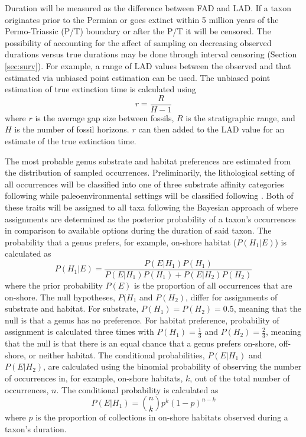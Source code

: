 \documentclass[12pt,letterpaper]{article}
\begin{document}
Duration will be measured as the difference between FAD and LAD. If a taxon originates prior to the Permian or goes extinct within 5 million years of the Permo-Triassic (P/T) boundary or after the P/T it will be censored. The possibility of accounting for the affect of sampling on decreasing observed durations versus true durations may be done through interval censoring (Section \ref{sec:surv}). For example, a range of LAD values between the observed and that estimated via unbiased point estimation \citep{Strauss1989,Alvarez1983a} can be used. The unbiased point estimation of true extinction time is calculated using
\begin{equation}
  r = \frac{R}{H - 1}
  \label{eq:stratest}
\end{equation}
where \(r\) is the average gap size between fossils, \(R\) is the stratigraphic range, and \(H\) is the number of fossil horizons. \(r\) can then added to the LAD value for an estimate of the true extinction time.

The most probable genus substrate and habitat preferences are estimated from the distribution of sampled occurrences. Preliminarily, the lithological setting of all occurrences will be classified into one of three substrate affinity categories following \citet{Foote2006} while paleoenvironmental settings will be classified following \citet{Kiessling2007}. Both of these traits will be assigned to all taxa following the Bayesian approach of \citet{Simpson2009} where assignments are determined as the posterior probability of a taxon's occurrences in comparison to available options during the duration of said taxon. The probability that a genus prefers, for example, on-shore habitat (\(P(H_{1}|E)\)) is calculated as
\begin{equation}
  P(H_{1}|E) = \frac{P(E|H_{1})P(H_{1})}{P(E|H_{1})P(H_{1}) + P(E|H_{2})P(H_{2})}
  \label{eq:aff}
\end{equation}
where the prior probability \(P(E)\) is the proportion of all occurrences that are on-shore. The null hypotheses, \(P(H_{1}\) and \(P(H_{2})\), differ for assignments of substrate and habitat. For substrate, \(P(H_{1}) = P(H_{2}) = 0.5\), meaning that the null is that a genus has no preference. For habitat preference, probability of assignment is calculated three times with \(P(H_{1}) = \frac{1}{3}\) and \(P(H_{2}) = \frac{2}{3}\), meaning that the null is that there is an equal chance that a genus prefers on-shore, off-shore, or neither habitat. The conditional probabilities, \(P(E|H_{1})\) and \(P(E|H_{2})\), are calculated using the binomial probability of observing the number of occurrences in, for example, on-shore habitats, \(k\), out of the total number of occurrences, \(n\). The conditional probability is calculated as
\begin{equation}
  P(E|H_{1}) = \binom{n}{k} p^{k}(1 - p)^{n - k}
  \label{eq:condprob}
\end{equation}
where \(p\) is the proportion of collections in on-shore habitats observed during a taxon's duration.
\end{document}
